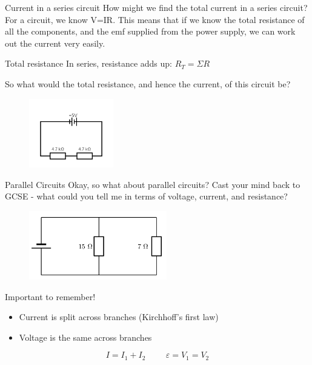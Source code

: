 \documentclass[../Main.tex]{subfiles}
\begin{document}
\begin{frame}{Current in a series circuit}
    How might we find the total current in a series circuit? \pause
    \newline \newline
    For a circuit, we know V=IR. This means that if we know the total resistance of all the components, and the emf supplied from the power supply, we can work out the current very easily. 
   
    \begin{block}{Total resistance}
    In series, resistance adds up: $R_T= \Sigma R$
    \end{block}
    
    So what would the total resistance, and hence the current, of this circuit be?
    
    \begin{figure}
        \centering
        \includegraphics[height=3cm]{Electricity_Images/series_circuit.png}
    \end{figure}
\end{frame}

\begin{frame}{Parallel Circuits}
    Okay, so what about parallel circuits? Cast your mind back to GCSE - what could you tell me in terms of voltage, current, and resistance?
    
    \begin{figure}
        \centering
        \includegraphics[height=3cm]{Electricity_Images/parallel_circuit.png}
    \end{figure} \pause
    
       \begin{block}{Important to remember!}
    \begin{itemize}
        \item Current is split across branches (Kirchhoff's first law)
        \item Voltage is the same across branches
    \end{itemize}
    
    \begin{equation*}
        I=I_1+I_2 \hspace{1cm} \varepsilon = V_1 = V_2 
    \end{equation*}
    \end{block}
\end{frame}
\end{document}
